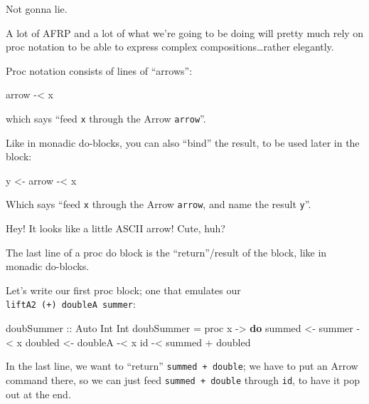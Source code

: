 \documentclass[]{article}
\newenvironment{Shaded}{}{}
\newcommand{\KeywordTok}[1]{\textcolor[rgb]{0.00,0.44,0.13}{\textbf{{#1}}}}
\newcommand{\DataTypeTok}[1]{\textcolor[rgb]{0.56,0.13,0.00}{{#1}}}
\newcommand{\OtherTok}[1]{\textcolor[rgb]{0.00,0.44,0.13}{{#1}}}
\newcommand{\FunctionTok}[1]{\textcolor[rgb]{0.02,0.16,0.49}{{#1}}}
\newcommand{\NormalTok}[1]{{#1}}
\begin{document}
Not gonna lie.

A lot of AFRP and a lot of what we're going to be doing will pretty much rely on
proc notation to be able to express complex compositions\ldots{}rather
elegantly.

Proc notation consists of lines of ``arrows'':

\begin{Shaded}
\begin{Highlighting}[]
\NormalTok{arrow }\FunctionTok{-<} \NormalTok{x}
\end{Highlighting}
\end{Shaded}

which says ``feed \texttt{x} through the Arrow \texttt{arrow}''.

Like in monadic do-blocks, you can also ``bind'' the result, to be used later in
the block:

\begin{Shaded}
\begin{Highlighting}[]
\NormalTok{y }\OtherTok{<-} \NormalTok{arrow }\FunctionTok{-<} \NormalTok{x}
\end{Highlighting}
\end{Shaded}

Which says ``feed \texttt{x} through the Arrow \texttt{arrow}, and name the
result \texttt{y}''.

Hey! It looks like a little ASCII arrow! Cute, huh?

The last line of a proc do block is the ``return''/result of the block, like in
monadic do-blocks.

Let's write our first proc block; one that emulates our
\texttt{liftA2\ (+)\ doubleA\ summer}:

\begin{Shaded}
\begin{Highlighting}[]
\OtherTok{doubSummer ::} \DataTypeTok{Auto} \DataTypeTok{Int} \DataTypeTok{Int}
\NormalTok{doubSummer }\FunctionTok{=} \NormalTok{proc x }\OtherTok{->} \KeywordTok{do}
    \NormalTok{summed  }\OtherTok{<-} \NormalTok{summer  }\FunctionTok{-<} \NormalTok{x}
    \NormalTok{doubled }\OtherTok{<-} \NormalTok{doubleA }\FunctionTok{-<} \NormalTok{x}
    \NormalTok{id }\FunctionTok{-<} \NormalTok{summed }\FunctionTok{+} \NormalTok{doubled}
\end{Highlighting}
\end{Shaded}

In the last line, we want to ``return'' \texttt{summed\ +\ double}; we have to
put an Arrow command there, so we can just feed \texttt{summed\ +\ double}
through \texttt{id}, to have it pop out at the end.
\end{document}
